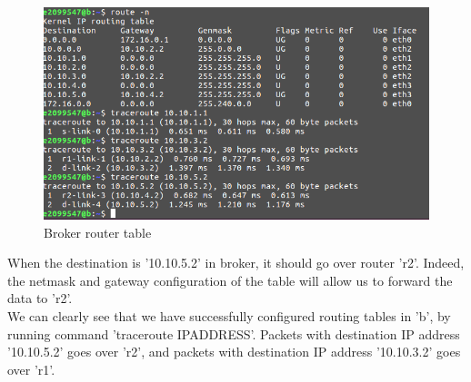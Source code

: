 \documentclass[12pt,journal,compsoc]{IEEEtran}
\begin{document}
\begin{figure}[h!]
\centering
\captionsetup{justification=centering}
\includegraphics[width = \linewidth]{routeb.png}
\caption{Broker router table}
\label{fig:routeb}
\end{figure}
When the destination is '10.10.5.2' in broker, it should go over router 'r2'. Indeed, the netmask and gateway configuration of the table will allow us to forward the data to 'r2'.\\
We can clearly see that we have successfully configured routing tables in 'b', by running command 'traceroute IPADDRESS'. Packets with destination IP address '10.10.5.2' goes over 'r2', and packets with destination IP address '10.10.3.2' goes over 'r1'.\\
\end{document}
